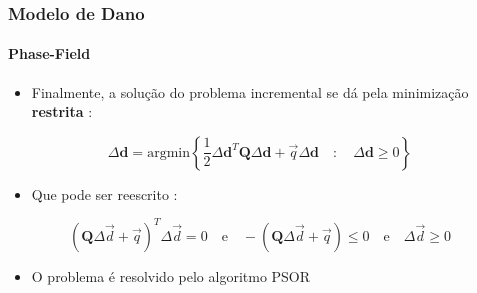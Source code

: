 \documentclass{beamer}
\begin{document}
\begin{frame}
    \frametitle{Modelo de Dano}
    \framesubtitle{Phase-Field}

    \begin{itemize}
        \item Finalmente, a solução do problema incremental se dá pela minimização \textbf{restrita} :
    \end{itemize}

    \begin{equation}
        \Delta \boldsymbol{d} = \text{argmin}\left\{\frac{1}{2}\Delta \boldsymbol{d}^T \mathbf{Q} \Delta \boldsymbol{d} + \vec{q} \Delta \boldsymbol{d} \quad : \quad \Delta \boldsymbol{d} \geqslant 0 \right\}
    \end{equation}

    \begin{itemize}
        \item Que pode ser reescrito :
    \end{itemize}

    \begin{equation}
        \left(\mathbf{Q}\Delta\vec{d}+\vec{q}\right)^T\Delta\vec{d} = 0 \quad \text{e} \quad -\left(\mathbf{Q}\Delta \vec{d} +\vec{q}\right) \leqslant 0 \quad \text{e} \quad \Delta \vec{d} \geqslant 0
    \end{equation}

    \begin{itemize}
        \item O problema é resolvido pelo algoritmo PSOR \Textcite{Marengo2021}
    \end{itemize}

\end{frame}



\begin{frame}

    \begin{algorithm}[H]
        \caption{Pseudo-Algoritmo}
        \begin{algorithmic}[1]
            \footnotesize %
                 
                 
                \EndWhile
            \EndFor
        \end{algorithmic}
    \end{algorithm}

\end{frame}
\end{document}
